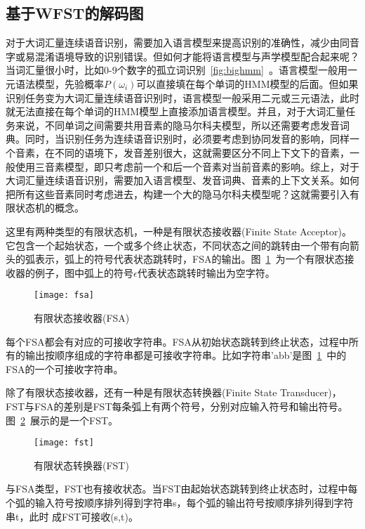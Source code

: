 \subsection{基于WFST的解码图}
对于大词汇量连续语音识别，需要加入语言模型来提高识别的准确性，减少由同音字或易混淆语境导致的识别错误。但如何才能将语言模型与声学模型配合起来呢？当词汇量很小时，比如0-9个数字的孤立词识别~\ref{fig:bighmm}~。语言模型一般用一元语法模型，先验概率$P(\omega_i)$可以直接填在每个单词的HMM模型的后面。但如果识别任务变为大词汇量连续语音识别时，语言模型一般采用二元或三元语法，此时就无法直接在每个单词的HMM模型上直接添加语言模型。并且，对于大词汇量任务来说，不同单词之间需要共用音素的隐马尔科夫模型，所以还需要考虑发音词典。同时，当识别任务为连续语音识别时，必须要考虑到协同发音的影响，同样一个音素，在不同的语境下，发音差别很大，这就需要区分不同上下文下的音素，一般使用三音素模型，即只考虑前一个和后一个音素对当前音素的影响。综上，对于大词汇量连续语音识别，需要加入语言模型、发音词典、音素的上下文关系。如何把所有这些音素同时考虑进去，构建一个大的隐马尔科夫模型呢？这就需要引入有限状态机的概念。

这里有两种类型的有限状态机，一种是有限状态接收器(Finite State Acceptor)。它包含一个起始状态，一个或多个终止状态，不同状态之间的跳转由一个带有向箭头的弧表示，弧上的符号代表状态跳转时，FSA的输出。图~\ref{fig:fsa}~为一个有限状态接收器的例子，图中弧上的符号$\epsilon$代表状态跳转时输出为空字符。
\begin{figure}[htbp]
\centering
\texttt{[image: fsa]}
\caption{有限状态接收器(FSA)}\label{fig:fsa}
\vspace{\baselineskip}
\end{figure}

每个FSA都会有对应的可接收字符串。FSA从初始状态跳转到终止状态，过程中所有的输出按顺序组成的字符串都是可接收字符串。比如字符串'abb'是图~\ref{fig:fsa}~中的FSA的一个可接收字符串。

除了有限状态接收器，还有一种是有限状态转换器(Finite State Transducer)，FST与FSA的差别是FST每条弧上有两个符号，分别对应输入符号和输出符号。图~\ref{fig:fst}~展示的是一个FST。
\begin{figure}[htbp]
\centering
\texttt{[image: fst]}
\caption{有限状态转换器(FST)}\label{fig:fst}
\vspace{\baselineskip}
\end{figure}

与FSA类型，FST也有接收状态。当FST由起始状态跳转到终止状态时，过程中每个弧的输入符号按顺序排列得到字符串s，每个弧的输出符号按顺序排列得到字符串t，此时
成FST可接收(s,t)。

